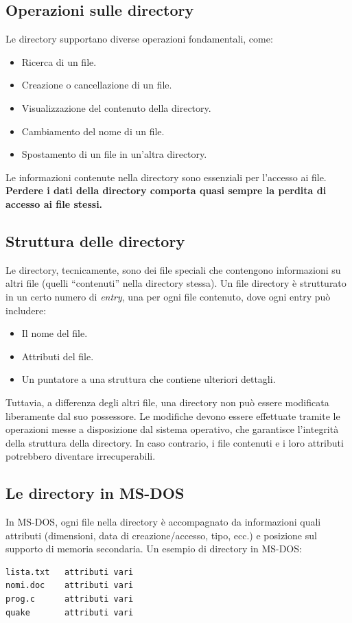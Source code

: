\subsection{Operazioni sulle directory}
Le directory supportano diverse operazioni fondamentali, come:
\begin{itemize}
    \item Ricerca di un file.
    \item Creazione o cancellazione di un file.
    \item Visualizzazione del contenuto della directory.
    \item Cambiamento del nome di un file.
    \item Spostamento di un file in un’altra directory.
\end{itemize}

Le informazioni contenute nella directory sono essenziali per l’accesso ai file. \textbf{Perdere i dati della directory comporta quasi sempre la perdita di accesso ai file stessi.}

\subsection{Struttura delle directory}
Le directory, tecnicamente, sono dei file speciali che contengono informazioni su altri file (quelli “contenuti” nella directory stessa). Un file directory è strutturato in un certo numero di \textit{entry}, una per ogni file contenuto, dove ogni entry può includere:
\begin{itemize}
    \item Il nome del file.
    \item Attributi del file.
    \item Un puntatore a una struttura che contiene ulteriori dettagli.
\end{itemize}

Tuttavia, a differenza degli altri file, una directory non può essere modificata liberamente dal suo possessore. Le modifiche devono essere effettuate tramite le operazioni messe a disposizione dal sistema operativo, che garantisce l’integrità della struttura della directory. In caso contrario, i file contenuti e i loro attributi potrebbero diventare irrecuperabili.

\subsection{Le directory in MS-DOS}
In MS-DOS, ogni file nella directory è accompagnato da informazioni quali attributi (dimensioni, data di creazione/accesso, tipo, ecc.) e posizione sul supporto di memoria secondaria. Un esempio di directory in MS-DOS:
\begin{verbatim}
lista.txt   attributi vari
nomi.doc    attributi vari
prog.c      attributi vari
quake       attributi vari
\end{verbatim}

